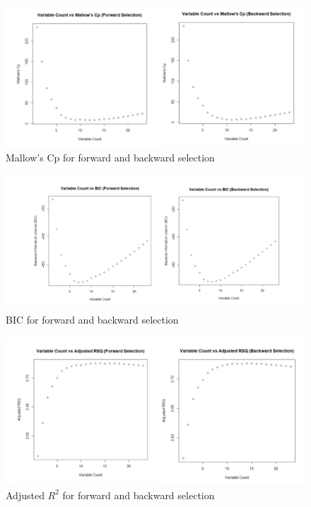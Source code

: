 

\begin{figure}[hbt!]
    \centering
    \includegraphics[scale=0.34]{img/mallowcp.png}
    \caption{Mallow's Cp for forward and backward selection}
    \label{fig:mallowcp}
\end{figure}

\begin{figure}[hbt!]
    \centering
    \includegraphics[scale=0.35]{img/bic.png}
    \caption{BIC for forward and backward selection}
    \label{fig:bic}
\end{figure}

\begin{figure}[hbt!]
    \centering
    \includegraphics[scale=0.37]{img/rsq.png}
    \caption{Adjusted $R^2$ for forward and backward selection}
    \label{fig:rsq}
\end{figure}

